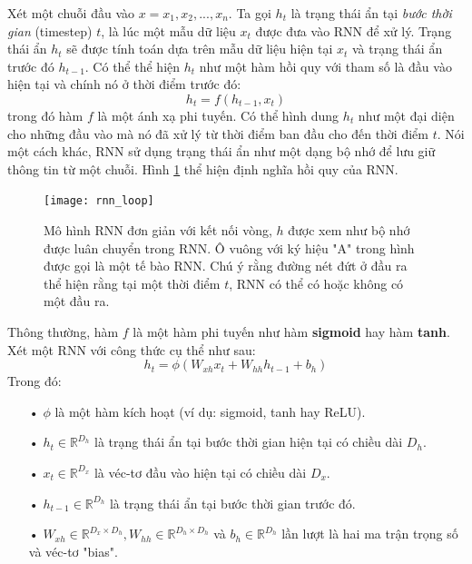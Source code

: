 Xét một chuỗi đầu vào $x={x_1,x_2,...,x_n}$. Ta gọi $h_t$ là trạng thái ẩn tại \textit{bước thời gian} (timestep) $t$, là lúc một mẫu dữ liệu $x_t$ được đưa vào RNN để xử lý. Trạng thái ẩn $h_t$ sẽ được tính toán dựa trên mẫu dữ liệu hiện tại $x_t$ và trạng thái ẩn trước đó $h_{t-1}$. Có thể thể hiện $h_t$ như một hàm hồi quy với tham số là đầu vào hiện tại và chính nó ở thời điểm trước đó:
\begin{equation} \label{basicRnnEquation}
	h_t = f \left(h_{t-1}, x_t \right)
\end{equation}
trong đó hàm $f$ là một ánh xạ phi tuyến. Có thể hình dung $h_t$ như một đại diện cho những đầu vào mà nó đã xử lý từ thời điểm ban đầu cho đến thời điểm $t$. Nói một cách khác, RNN sử dụng trạng thái ẩn như một dạng bộ nhớ để lưu giữ thông tin từ một chuỗi. Hình \ref{fig_rnn_loop} thể hiện định nghĩa hồi quy của RNN.

\begin{figure}
	\centering
	\texttt{[image: rnn\_loop]}
	\caption[Mô hình RNN với kết nối vòng]{Mô hình RNN đơn giản với kết nối vòng, \textbf{$h$} được xem như bộ nhớ được luân chuyển trong RNN. Ô vuông với ký hiệu "A" trong hình được gọi là một tế bào RNN. Chú ý rằng đường nét đứt ở đầu ra thể hiện rằng tại một thời điểm $t$, RNN có thể có hoặc không có một đầu ra.}
	\label{fig_rnn_loop}
\end{figure}
Thông thường, hàm $f$ là một hàm phi tuyến như hàm \textbf{sigmoid} hay hàm \textbf{tanh}. Xét một RNN với công thức cụ thể như sau:
\begin{equation} \label{rnnWithTanh}
	h_t = \phi \left(W_{xh} x_t + W_{hh}h_{t-1} + b_h \right)
\end{equation}
Trong đó:
\begin{itemize}
	\item[•] $\phi$ là một hàm kích hoạt (ví dụ: sigmoid, tanh hay ReLU).
	\item[•] $h_{t} \in \mathbb{R}^{D_h}$ là trạng thái ẩn tại bước thời gian hiện tại có chiều dài $D_h$.
	\item[•] $x_t \in \mathbb{R}^{D_x}$ là véc-tơ đầu vào hiện tại có chiều dài $D_x$.
	\item[•] $h_{t-1} \in \mathbb{R}^{D_h}$ là trạng thái ẩn tại bước thời gian trước đó.
	\item[•] $W_{xh} \in \mathbb{R}^{D_x \times D_h}, W_{hh} \in \mathbb{R}^{D_h \times D_h}$ và $b_h \in \mathbb{R}^{D_h}$ lần lượt là hai ma trận trọng số và véc-tơ "bias".
\end{itemize}

